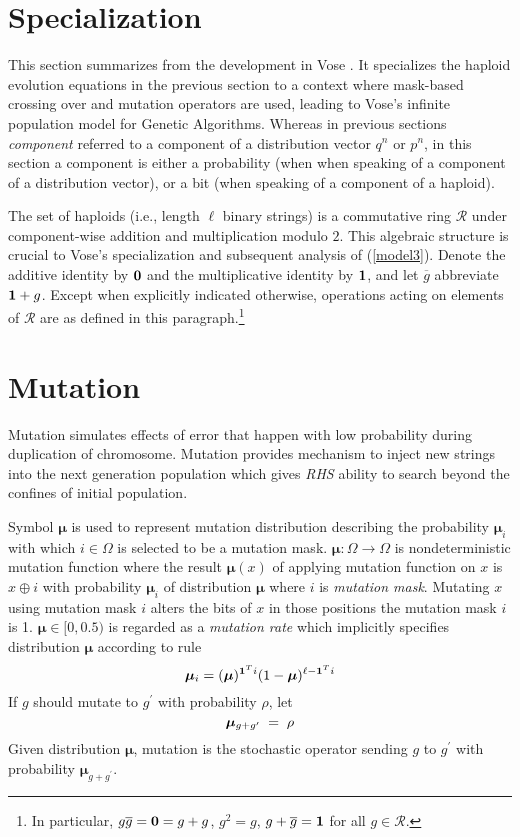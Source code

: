 \section{Specialization}\label{specialize}
This section summarizes from the development in Vose \cite{Vose1999}.
It specializes the haploid evolution equations in the previous section 
to a context where mask-based crossing over and mutation operators are used, 
leading to Vose's infinite population model for Genetic Algorithms.  Whereas 
in previous sections {\em component} referred to a component
of a distribution vector $q^n$ or $p^n$, in this section a component
is either a probability (when when speaking of a component of a
distribution vector), or a bit (when speaking of a component of a
haploid).

The set of haploids (i.e., length $\ell$ binary strings) is a
commutative ring $\mathcal{R}$ under component-wise addition and
multiplication modulo $2$.  This algebraic structure is crucial to
Vose's specialization and subsequent analysis of
(\ref{model3}). Denote the additive identity by ${\bf 0}$ and the
multiplicative identity by ${\bf 1}$, and let $\overline{g}$
abbreviate ${\bf 1} + g$.  Except when explicitly indicated otherwise,
operations acting on elements of $\mathcal{R}$ are as defined in this
paragraph.\footnote{In particular, $g \overline{g} = {\bf 0} = g+g$,
  $g^2 = g$, $g + \overline{g} = {\bf 1}$ for all $g \in
  \mathcal{R}$.}

\section{Mutation}
Mutation simulates effects of error that happen with low probability during duplication of chromosome. Mutation provides mechanism to inject new strings into the next generation population which gives {\em RHS} ability to search beyond the confines of initial population.

Symbol $\bm{\mu}$ is used to represent mutation distribution describing the probability $\bm{\mu}_i$ with which $i \in \Omega$ is selected to be a mutation mask. $\bm{\mu} : \Omega \rightarrow \Omega$ is nondeterministic mutation function where the result $\bm{\mu}(x)$ of applying mutation function on $x$ is $x \oplus i$ with probability $\bm{\mu}_i$ of distribution $\bm{\mu}$ where $i$ is {\em mutation mask}. Mutating $x$ using mutation mask $i$ alters the bits of $x$ in those positions the mutation mask $i$ is 1.
$\bm{\mu} \in [0, 0.5)$ is regarded as a {\em mutation rate} which implicitly specifies distribution $\bm{\mu}$ according to rule \cite{VoseWright1998}
\[
\bm{\mu}_i = (\bm{\mu})^{{\bf 1}^Ti} (1-\bm{\mu})^{\ell- {\bf 1}^Ti}
\]
If $g$ should mutate to $g^\prime$ with probability $\rho$,
let\\[-0.2in]
\[
\bm{\mu}_{g + g^\prime} \; = \; \rho\\[0.05in]
\]
Given distribution $\bm{\mu}$, mutation is the stochastic operator sending
$g$ to $g^\prime$ with probability $\bm{\mu}_{g + g^\prime}$.


